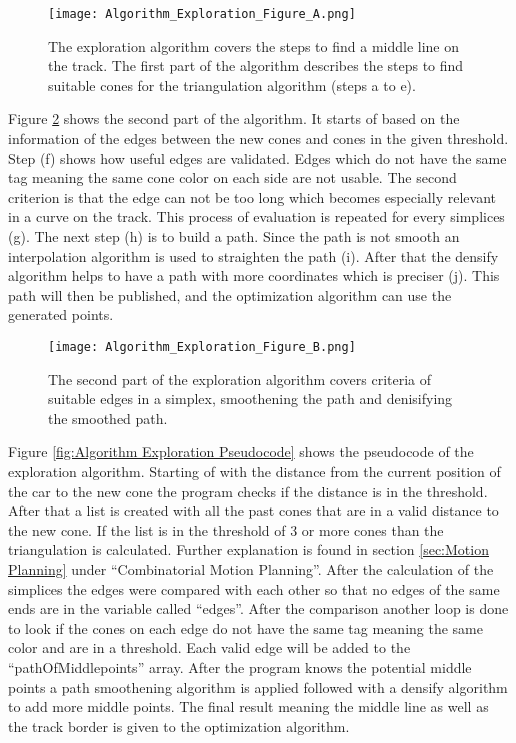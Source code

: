 \begin{figure}[H]
    \centering
    \texttt{[image: Algorithm\_Exploration\_Figure\_A.png]}
    \caption{The exploration algorithm covers the steps to find a middle line on the track. The first part of the algorithm describes the steps to find suitable cones for the triangulation algorithm (steps a to e).}
    \label{fig:Algorithm Exploration Figure A}
\end{figure}

Figure \ref{fig:Algorithm Exploration Figure B} shows the second part of the algorithm. It starts of based on the information of the edges between the new cones and cones in the given threshold. Step (f) shows how useful edges are validated. Edges which do not have the same tag meaning the same cone color on each side are not usable. The second criterion is that the edge can not be too long which becomes especially relevant in a curve on the track. This process of evaluation is repeated for every simplices (g). The next step (h) is to build a path. Since the path is not smooth an interpolation algorithm is used to straighten the path (i). After that the densify algorithm helps to have a path with more coordinates which is preciser (j). This path will then be published, and the optimization algorithm can use the generated points.

\begin{figure}[H]
    \centering
    \texttt{[image: Algorithm\_Exploration\_Figure\_B.png]}
    \caption{The second part of the exploration algorithm covers criteria of suitable edges in a simplex, smoothening the path and denisifying the smoothed path.}
    \label{fig:Algorithm Exploration Figure B}
\end{figure}

Figure \ref{fig:Algorithm Exploration Pseudocode} shows the pseudocode of the exploration algorithm. Starting of with the distance from the current position of the car to the new cone the program checks if the distance is in the threshold. After that a list is created with all the past cones that are in a valid distance to the new cone. If the list is in the threshold of 3 or more cones than the triangulation is calculated. Further explanation is found in section \ref{sec:Motion Planning} under ``Combinatorial Motion Planning''. After the calculation of the simplices the edges were compared with each other so that no edges of the same ends are in the variable called ``edges''. After the comparison another loop is done to look if the cones on each edge do not have the same tag meaning the same color and are in a threshold. Each valid edge will be added to the ``pathOfMiddlepoints'' array. After the program knows the potential middle points a path smoothening algorithm is applied followed with a densify algorithm to add more middle points. The final result meaning the middle line as well as the track border is given to the optimization algorithm.

